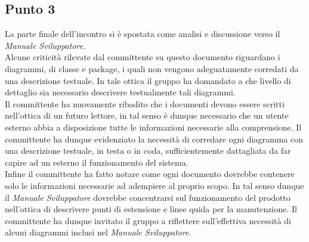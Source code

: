 \subsection{Punto 3}
La parte finale dell'incontro si è spostata come analisi e discussione verso il \textit{Manuale Sviluppatore}.\\
Alcune criticità rilevate dal committente su questo documento riguardano i diagrammi, di classe e package, i quali non vengono adeguatamente corredati da una descrizione testuale. In tale ottica il gruppo ha domandato a che livello di dettaglio sia necessario descrivere testualmente tali diagrammi.\\
Il committente ha nuovamente ribadito che i documenti devono essere scritti nell'ottica di un futuro lettore, in tal senso è dunque necessario che un utente esterno abbia a disposizione tutte le informazioni necessarie alla comprensione. Il committente ha dunque evidenziato la necessità di corredare ogni diagramma con una descrizione testuale, in testa o in coda, sufficientemente dattagliata da far capire ad un esterno il funzionamento del sistema.\\
Infine il committente ha fatto notare come ogni documento dovrebbe contenere solo le informazioni necessarie ad adempiere al proprio scopo. In tal senso dunque il \textit{Manuale Sviluppatore} dovrebbe concentrarsi sul funzionamento del prodotto nell'ottica di descrivere punti di estensione e linee quida per la manutenzione. Il committente ha dunque invitato il gruppo a riflettere sull'effettiva necessità di alcuni diagrammi inclusi nel \textit{Manuale Sviluppatore}.

